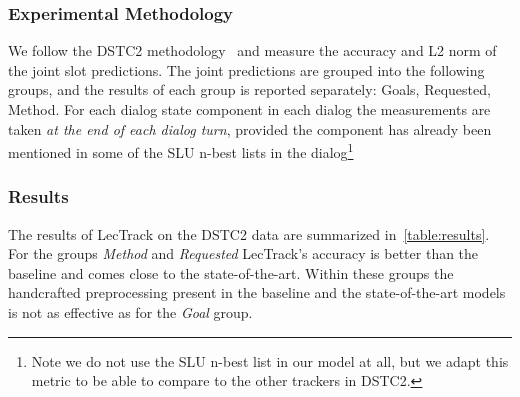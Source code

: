 \documentclass[runningheads,a4paper]{llncs}
\begin{document}
\subsubsection{Experimental Methodology}  %
We follow the DSTC2 methodology~\cite{henderson2014second} and measure the accuracy and L2 norm of the joint slot predictions.
The joint predictions are grouped into the following groups, and the results of each group is reported separately: Goals, Requested, Method.
For each dialog state component in each dialog the measurements are taken \emph{at the end of each dialog turn}, provided the component has already been mentioned in some of the SLU n-best lists in the dialog\footnote{Note we do not use the SLU n-best list in our model at all, but we adapt this metric to be able to compare to the other trackers in DSTC2.}


\subsubsection{Results}
The results of LecTrack on the DSTC2 data are summarized in~\autoref{table:results}. For the groups \emph{Method} and \emph{Requested} LecTrack's accuracy is better than the baseline and comes close to the state-of-the-art. Within these groups the handcrafted preprocessing present in the baseline and the state-of-the-art models is not as effective as for the \emph{Goal} group.
\end{document}
